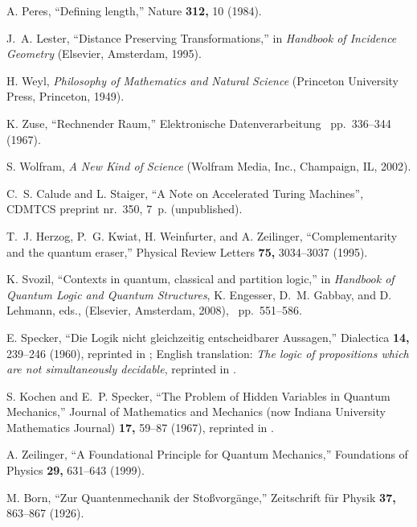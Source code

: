 \documentclass[11pt, pra,amsfonts,showpacs,showkeys]{revtex4}%
\begin{document}
%
%


\begin{thebibliography}{10}

A. Peres, ``Defining length,'' Nature {\bf 312,} 10 (1984).

J.~A. Lester, ``Distance Preserving Transformations,''  in {\em Handbook of
  Incidence Geometry} (Elsevier, Amsterdam, 1995).

H. Weyl, {\em Philosophy of Mathematics and Natural Science} (Princeton
  University Press, Princeton, 1949).

K. Zuse, ``{R}echnender {R}aum,'' Elektronische Datenverarbeitung \ pp.\
  336--344 (1967).

S. Wolfram, {\em A New Kind of Science} (Wolfram Media, Inc., Champaign, IL,
  2002).

C.~S. Calude and L. Staiger, ``A Note on Accelerated Turing Machines'', {C}DMTCS preprint nr.~350, 7~p. (unpublished).

T.~J. Herzog, P.~G. Kwiat, H. Weinfurter, and A. Zeilinger, ``Complementarity
  and the quantum eraser,'' Physical Review Letters {\bf 75,} 3034--3037
  (1995).

K. Svozil, ``Contexts in quantum, classical and partition logic,''  in {\em
  Handbook of Quantum Logic and Quantum Structures}, K. Engesser, D.~M. Gabbay,
  and D. Lehmann, eds., (Elsevier, Amsterdam, 2008), \ pp.\ 551--586.

E. Specker, ``{D}ie {L}ogik nicht gleichzeitig entscheidbarer {A}ussagen,''
  Dialectica {\bf 14,} 239--246 (1960), reprinted in \cite[pp.
  175--182]{specker-ges}; {E}nglish translation: {\it The logic of propositions
  which are not simultaneously decidable}, reprinted in \cite[pp.
  135-140]{hooker}.

S. Kochen and E.~P. Specker, ``The Problem of Hidden Variables in Quantum
  Mechanics,'' Journal of Mathematics and Mechanics (now Indiana University
  Mathematics Journal) {\bf 17,} 59--87 (1967), reprinted in \cite[pp.
  235--263]{specker-ges}.

A. Zeilinger, ``A Foundational Principle for Quantum Mechanics,'' Foundations
  of Physics {\bf 29,} 631--643 (1999).

M. Born, ``Zur {Q}uantenmechanik der {S}to{\ss}vorg{\"{a}}nge,'' Zeitschrift
  f{\"{u}}r Physik {\bf 37,} 863--867 (1926).


\end{thebibliography}
\end{document}
